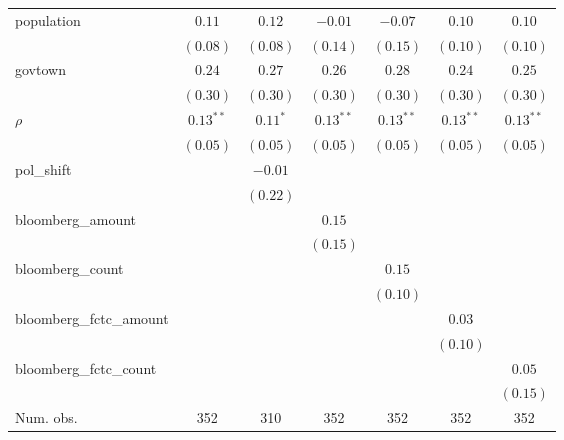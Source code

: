 \begin{table}[!h]
\begin{center}
\begin{tabular}{l c c c c c c }
population              & $0.11$       & $0.12$       & $-0.01$      & $-0.07$      & $0.10$       & $0.10$       \\
                        & $(0.08)$     & $(0.08)$     & $(0.14)$     & $(0.15)$     & $(0.10)$     & $(0.10)$     \\
govtown                 & $0.24$       & $0.27$       & $0.26$       & $0.28$       & $0.24$       & $0.25$       \\
                        & $(0.30)$     & $(0.30)$     & $(0.30)$     & $(0.30)$     & $(0.30)$     & $(0.30)$     \\
$\rho$                  & $0.13^{**}$  & $0.11^{*}$   & $0.13^{**}$  & $0.13^{**}$  & $0.13^{**}$  & $0.13^{**}$  \\
                        & $(0.05)$     & $(0.05)$     & $(0.05)$     & $(0.05)$     & $(0.05)$     & $(0.05)$     \\
pol\_shift              &              & $-0.01$      &              &              &              &              \\
                        &              & $(0.22)$     &              &              &              &              \\
bloomberg\_amount       &              &              & $0.15$       &              &              &              \\
                        &              &              & $(0.15)$     &              &              &              \\
bloomberg\_count        &              &              &              & $0.15$       &              &              \\
                        &              &              &              & $(0.10)$     &              &              \\
bloomberg\_fctc\_amount &              &              &              &              & $0.03$       &              \\
                        &              &              &              &              & $(0.10)$     &              \\
bloomberg\_fctc\_count  &              &              &              &              &              & $0.05$       \\
                        &              &              &              &              &              & $(0.15)$     \\
\midrule
Num. obs.               & 352          & 310          & 352          & 352          & 352          & 352          \\

\end{tabular}
\end{center}
\end{table}
